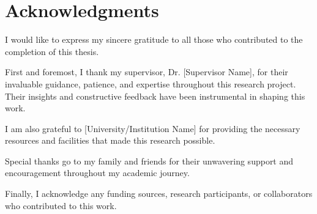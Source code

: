 \chapter*{Acknowledgments}

I would like to express my sincere gratitude to all those who contributed to the completion of this thesis.

First and foremost, I thank my supervisor, Dr. [Supervisor Name], for their invaluable guidance, patience, and expertise throughout this research project. Their insights and constructive feedback have been instrumental in shaping this work.

I am also grateful to [University/Institution Name] for providing the necessary resources and facilities that made this research possible.

Special thanks go to my family and friends for their unwavering support and encouragement throughout my academic journey.

Finally, I acknowledge any funding sources, research participants, or collaborators who contributed to this work.

\cleardoublepage